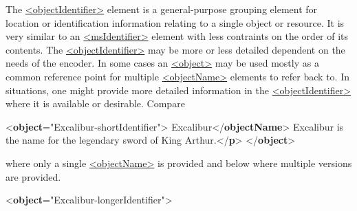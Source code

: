 The \hyperref[TEI.objectIdentifier]{<objectIdentifier>} element is a general-purpose grouping element for location or identification information relating to a single object or resource. It is very similar to an \hyperref[TEI.msIdentifier]{<msIdentifier>} element with less contraints on the order of its contents. The \hyperref[TEI.objectIdentifier]{<objectIdentifier>} may be more or less detailed dependent on the needs of the encoder. In some cases an \hyperref[TEI.object]{<object>} may be used mostly as a common reference point for multiple \hyperref[TEI.objectName]{<objectName>} elements to refer back to. In situations, one might provide more detailed information in the \hyperref[TEI.objectIdentifier]{<objectIdentifier>} where it is available or desirable. Compare \par\bgroup{}\exampleFont \begin{shaded}\noindent\mbox{}{<\textbf{object}\hspace*{1em}{xml:id}="{Excalibur-shortIdentifier}">}\mbox{}\newline 
{}\mbox{}\newline 
\hspace*{1em}Excalibur{</\textbf{objectName}>}\mbox{}\newline 
{}\mbox{}\newline 
{}Excalibur is the name for the legendary sword of King Arthur.{</\textbf{p}>}\mbox{}\newline 
{</\textbf{object}>}\end{shaded}\egroup\par \noindent  where only a single \hyperref[TEI.objectName]{<objectName>} is provided and below where multiple versions are provided. \par\bgroup{}\exampleFont \begin{shaded}\noindent\mbox{}{<\textbf{object}\hspace*{1em}{xml:id}="{Excalibur-longerIdentifier}">}\mbox{}\newline 

\end{shaded}
